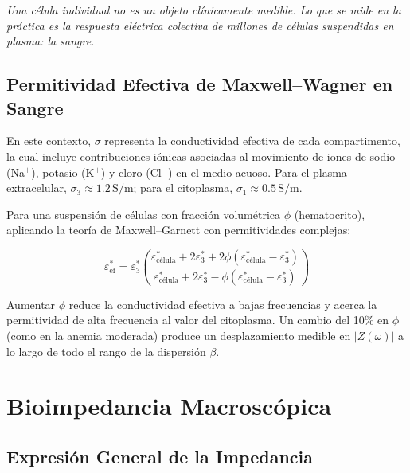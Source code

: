 \documentclass[12pt]{article}
\begin{document}
\label{sec:sangre}


\noindent\textit{Una c\'elula individual no es un objeto cl\'inicamente medible. Lo que se mide en
la pr\'actica es la respuesta el\'ectrica colectiva de millones de c\'elulas suspendidas en plasma: la
sangre.}

\subsection{Permitividad Efectiva de Maxwell--Wagner en Sangre}

En este contexto, $\sigma$ representa la conductividad efectiva de cada
compartimento, la cual incluye contribuciones i\'onicas asociadas al movimiento
de iones de sodio (Na$^+$), potasio (K$^+$) y cloro (Cl$^-$) en el medio
acuoso. Para el plasma extracelular, $\sigma_3 \approx 1.2\,\text{S/m}$;
para el citoplasma, $\sigma_1 \approx 0.5\,\text{S/m}$.

Para una suspensi\'on de c\'elulas con fracci\'on volum\'etrica $\phi$ (hematocrito), aplicando la
teor\'ia de Maxwell--Garnett con permitividades complejas:

\begin{equation}
\varepsilon_{\text{ef}}^* =
\varepsilon_3^*\left(
\frac{\varepsilon_{\text{c\'elula}}^* + 2\varepsilon_3^* +
2\phi(\varepsilon_{\text{c\'elula}}^* - \varepsilon_3^*)}
{\varepsilon_{\text{c\'elula}}^* + 2\varepsilon_3^* - \phi(\varepsilon_{\text{c\'elula}}^* - \varepsilon_3^*)}
\right)
\label{eq:MWH}
\end{equation}

Aumentar $\phi$ reduce la conductividad efectiva a bajas frecuencias y acerca la permitividad de
alta frecuencia al valor del citoplasma. Un cambio del 10\% en $\phi$ (como en la anemia
moderada) produce un desplazamiento medible en $|Z(\omega)|$ a lo largo de todo el rango de
la dispersi\'on $\beta$.


\section{Bioimpedancia Macrosc\'opica}

\label{sec:macro}


\subsection{Expresi\'on General de la Impedancia}
\end{document}
